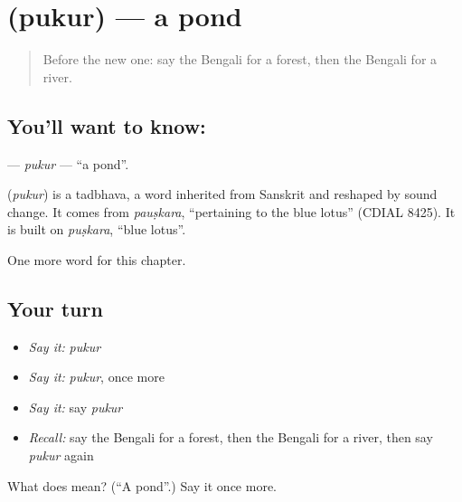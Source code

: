 \section[\texorpdfstring{\bn{পুকুর} (pukur)}{পুকুর (pukur)}]{ (pukur) — a pond}

\label{lesson:BN-C66-pukur}



\begin{quote}
Before the new one: say the Bengali for a forest, then the Bengali for a river.
\end{quote}

\subsection*{You'll want to know: }
\textbf{} — \emph{pukur} — \textquotedblleft{}a pond\textquotedblright{}.

\begin{cousinweb}
\textbf{} (\emph{pukur}) is a tadbhava, a word inherited from Sanskrit and reshaped by sound change. It comes from \emph{pauṣkara}, \textquotedblleft{}pertaining to the blue lotus\textquotedblright{} (CDIAL 8425). It is built on \emph{puṣkara}, \textquotedblleft{}blue lotus\textquotedblright{}.
\end{cousinweb}

\begin{grammarlens}[title={What you've built}]
One more word for this chapter.
\end{grammarlens}

\subsection*{Your turn}
\begin{itemize}
\raggedright
  \item \emph{Say it:} \emph{pukur}
  \item \emph{Say it:} \emph{pukur}, once more
  \item \emph{Say it:} say \emph{pukur}
  \item \emph{Recall:} say the Bengali for a forest, then the Bengali for a river, then say \emph{pukur} again
\end{itemize}

\begin{tcolorbox}[breakable,colback=teal!4,colframe=teal!35!black,title={Before you move on}]
What does  mean? (\textquotedblleft{}A pond\textquotedblright{}.) Say it once more.
\end{tcolorbox}
